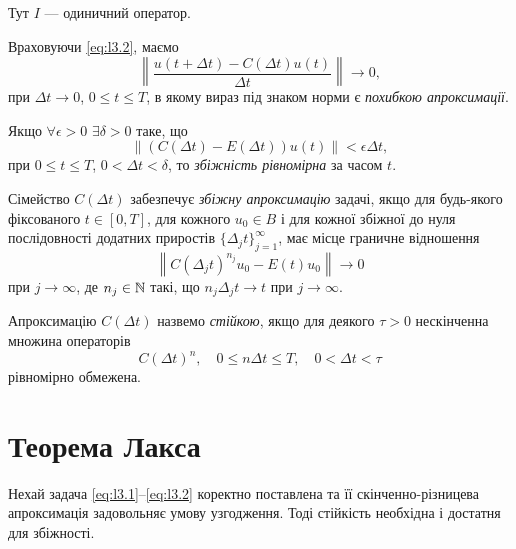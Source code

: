 Тут $I$ --- одиничний оператор.

\begin{definition}
    Враховуючи \eqref{eq:l3.2}, маємо
    \begin{equation}
        \label{eq:l3.6b}
        \left\| \frac{u(t + \Delta t) - C(\Delta t) u(t)}{\Delta t} \right\| \to 0,
    \end{equation}
    при $\Delta t \to 0$, $0 \le t \le T$, в якому вираз під знаком норми є \textit{похибкою апроксимації}.
\end{definition}

Якщо $\forall \epsilon > 0$ $\exists \delta > 0$ таке, що 
\begin{equation}
    \label{eq:l3.6c}
    \left\| \left( C(\Delta t) - E(\Delta t) \right) u(t) \right\| < \epsilon \Delta t,
\end{equation}
при $0 \le t \le T$, $0 < \Delta t < \delta$, то \textit{збіжність рівномірна} за часом $t$.

\begin{definition}
    Сімейство $C(\Delta t)$ забезпечує \textit{збіжну апроксимацію} задачі, якщо для будь-якого фіксованого $t \in [0, T]$, для кожного $u_0 \in B$ і для кожної збіжної до нуля послідовності додатних приростів $\{\Delta_j t\}_{j = 1}^\infty$, має місце граничне відношення 
    \begin{equation}
        \label{eq:l3.7}
        \left\| C(\Delta_j t)^{n_j} u_0 - E(t) u_0 \right\| \to 0
    \end{equation}
    при $j \to \infty$, де $n_j \in \mathbb{N}$ такі, що $n_j \Delta_j t \to t$ при $j \to \infty$.
\end{definition}

\begin{definition}
    Апроксимацію $C(\Delta t)$ назвемо \textit{стійкою}, якщо для деякого $\tau > 0$ нескінченна множина операторів 
    \begin{equation}
        \label{eq:l3.9}
        C(\Delta t)^n, \quad 0 \le n \Delta t \le T, \quad 0 < \Delta t < \tau
    \end{equation}
    рівномірно обмежена. 
\end{definition}

\section{Теорема Лакса}

\begin{theorem}
    Нехай задача \eqref{eq:l3.1}--\eqref{eq:l3.2} коректно поставлена та її скінченно-різницева апроксимація задовольняє умову узгодження. Тоді стійкість необхідна і достатня для збіжності.
\end{theorem}

